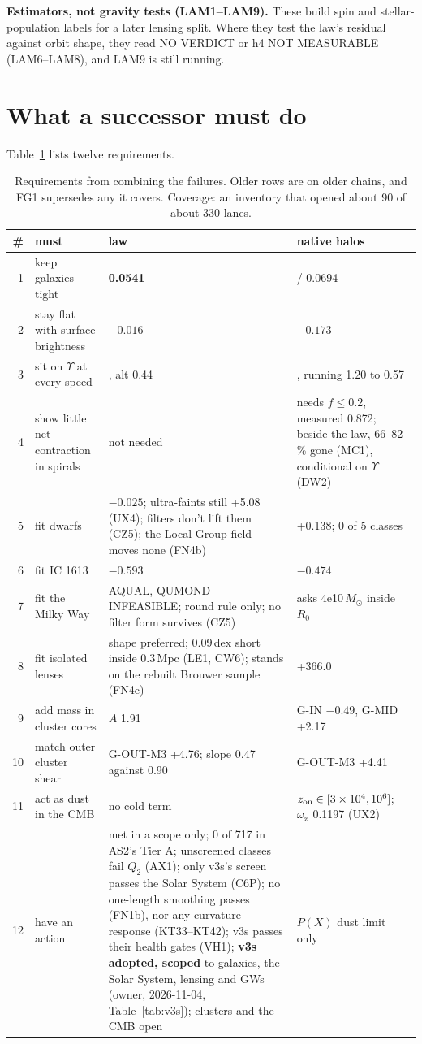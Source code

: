 \documentclass[10pt]{article}
\begin{document}
\textbf{Estimators, not gravity tests (LAM1--LAM9).} These build spin and stellar-population labels for a later lensing split. Where they test the law's residual against orbit shape, they read NO VERDICT or h4 NOT MEASURABLE (LAM6--LAM8), and LAM9 is still running.

\section{What a successor must do}\label{sec:req}
Table~\ref{tab:req} lists twelve requirements.

\begin{table}[!htbp]\centering\small
\caption{Requirements from combining the failures. Older rows are on older chains, and FG1 supersedes any it covers. Coverage: an inventory that opened about 90 of about 330 lanes.}\label{tab:req}
\begin{tabular}{r>{\raggedright\arraybackslash}p{4.4cm}>{\raggedright\arraybackslash}p{4.6cm}>{\raggedright\arraybackslash}p{4.8cm}}
\toprule
\# & must & law & native halos\\
\midrule
1 & keep galaxies tight & \textbf{0.0541} & 0.0682 / 0.0694\\
2 & stay flat with surface brightness & \textbf{$-0.016$} & $-0.173$\\
3 & sit on $\Upsilon$ at every speed & 0.52, alt 0.44 & 0.75, running 1.20 to 0.57\\
4 & show little net contraction in spirals & not needed & needs $f\le0.2$, measured 0.872; beside the law, 66--82\,\% gone (MC1), conditional on $\Upsilon$ (DW2)\\
5 & fit dwarfs & \textbf{$-0.025$}; ultra-faints still +5.08 (UX4); filters don't lift them (CZ5); the Local Group field moves none (FN4b) & +0.138; 0 of 5 classes\\
6 & fit IC 1613 & $-0.593$ & $-0.474$\\
7 & fit the Milky Way & AQUAL, QUMOND INFEASIBLE; round rule only; no filter form survives (CZ5) & asks 4e10\,$M_\odot$ inside $R_0$\\
8 & fit isolated lenses & shape preferred; 0.09\,dex short inside 0.3\,Mpc (LE1, CW6); stands on the rebuilt Brouwer sample (FN4c) & +366.0\\
9 & add mass in cluster cores & $A$ 1.91 & G-IN $-0.49$, G-MID +2.17\\
10 & match outer cluster shear & G-OUT-M3 +4.76; slope 0.47 against 0.90 & G-OUT-M3 +4.41\\
11 & act as dust in the CMB & no cold term & $z_{\rm on}\in[3\times10^4,10^6]$; $\omega_x$ 0.1197 (UX2)\\
12 & have an action & met in a scope only; 0 of 717 in AS2's Tier A; unscreened classes fail $Q_2$ (AX1); only v3s's screen passes the Solar System (C6P); no one-length smoothing passes (FN1b), nor any curvature response (KT33--KT42); v3s passes their health gates (VH1); \textbf{v3s adopted, scoped} to galaxies, the Solar System, lensing and GWs (owner, 2026-11-04, Table~\ref{tab:v3s}); clusters and the CMB open & $P(X)$ dust limit only\\
\bottomrule
\end{tabular}
\end{table}
\end{document}
